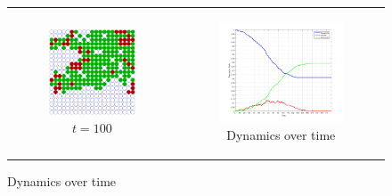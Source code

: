 \begin{figure}
\begin{center}
	\begin{tabular}{c c}
		\begin{subfigure}[b]{0.2\textwidth}
			\centering
			\includegraphics[width=1\textwidth, angle=0]{./fig/dynamics/SIR_environment_30x30agents_t100_01dt.png}
			\caption{$t = 100$}
			\label{fig:sir_env_t100}
		\end{subfigure}
    	
    	&
  
		\begin{subfigure}[b]{0.25\textwidth}
			\centering
			\includegraphics[width=1\textwidth, angle=0]{./fig/dynamics/SIR_dynamics_30x30agents_300t_01dt.png}
			\caption{Dynamics over time}
			\label{fig:sir_dynamics_30x30agents_300t_01dt}
		\end{subfigure}
	\end{tabular}
	

\end{center}
\end{figure}
